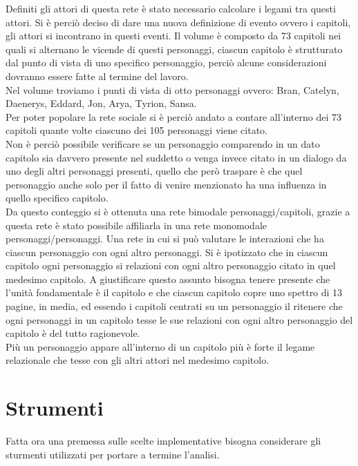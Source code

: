 \documentclass[a4paper]{article}
\begin{document}
Definiti gli attori di questa rete è stato necessario calcolare i legami tra questi attori. Si è perciò deciso di dare una nuova definizione di evento ovvero i capitoli, gli attori si incontrano in questi eventi. Il volume è composto da 73 capitoli nei quali si alternano le vicende di questi personaggi, ciascun capitolo è strutturato dal punto di vista di uno specifico personaggio, perciò alcune considerazioni dovranno essere fatte al termine del lavoro.\\
Nel volume troviamo i punti di vista di otto personaggi ovvero: Bran, Catelyn, Daenerys, Eddard, Jon, Arya, Tyrion, Sansa.\\
Per poter popolare la rete sociale si è perciò andato a contare all'interno dei 73 capitoli quante volte ciascuno dei 105 personaggi viene citato.\\
Non è perciò possibile verificare se un personaggio comparendo in un dato capitolo sia davvero presente nel suddetto o venga invece citato in un dialogo da uno degli altri personaggi presenti, quello che però traspare è che quel personaggio anche solo per il fatto di venire menzionato ha una influenza in quello specifico capitolo.\\

Da questo conteggio si è ottenuta una rete bimodale personaggi/capitoli, grazie a questa rete è stato possibile affiliarla in una rete monomodale personaggi/personaggi. Una rete in cui si può valutare le interazioni che ha ciascun personaggio con ogni altro personaggi. Si è ipotizzato che in ciascun capitolo ogni personaggio si relazioni con ogni altro personaggio citato in quel medesimo capitolo. A giustificare questo assunto bisogna tenere presente che l'unità fondamentale è il capitolo e che ciascun capitolo copre uno spettro di 13 pagine, in media, ed essendo i capitoli centrati su un personaggio il ritenere che ogni personaggi in un capitolo tesse le sue relazioni con ogni altro personaggio del capitolo è del tutto ragionevole.\\ 
Più un personaggio appare all'interno di un capitolo più è forte il legame relazionale che tesse con gli altri attori nel medesimo capitolo.



\section{Strumenti}
Fatta ora una premessa sulle scelte implementative bisogna considerare gli sturmenti utilizzati per portare a termine l'analisi.\\
\end{document}

